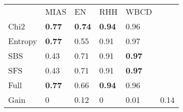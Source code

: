 \begin{tabular}{|l|l|l|l|l|l}
\cline{1-5}
        & MIAS              & EN                & RHH               & WBCD      &         \\
\cline{1-5}
Chi2    & \textbf{0.77}  & \textbf{0.74}  & \textbf{0.94}  & 0.96           &         \\
Entropy & \textbf{0.77}  & 0.55           & 0.91           & 0.97           &         \\
SBS     & 0.43           & 0.71           & 0.91           & \textbf{0.97}  &         \\
SFS     & 0.43           & 0.71           & 0.91           & \textbf{0.97}  &         \\
Full    & \textbf{0.77}  & 0.66           & \textbf{0.94}  & 0.96           &         \\
\cline{1-5}
\cline{1-5}
Gain    & 0                 & 0.12           & 0                 & 0.01           & 0.14 \\
\cline{1-5}
\end{tabular}
